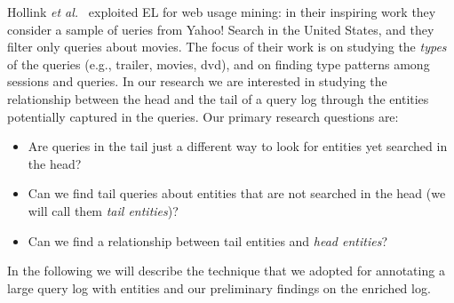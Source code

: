 

Hollink \emph{et al.}~\cite{hollink2013web} exploited EL for web usage mining: 
in their inspiring work they consider a sample of 
ueries from Yahoo! Search in the United States, and they filter only queries about movies. The focus
of their work is on studying the \emph{types} of the queries (e.g., trailer, movies, dvd), and on finding
type patterns among sessions and queries. In our research we are interested in studying the 
relationship between the head and the tail of a query log
through the entities potentially captured in the queries. Our primary research questions are:
\begin{itemize}
	\item Are queries in the tail just a different way to look for entities yet searched in the head? 
	\item Can we find tail queries about entities that are not searched in the head (we will call them \emph{tail entities})?
	\item Can we find a relationship between tail entities and \emph{head entities}?  
\end{itemize} 

In the following we will describe the technique that we adopted for annotating a large query log with entities 
and our preliminary findings on the enriched log.


 

